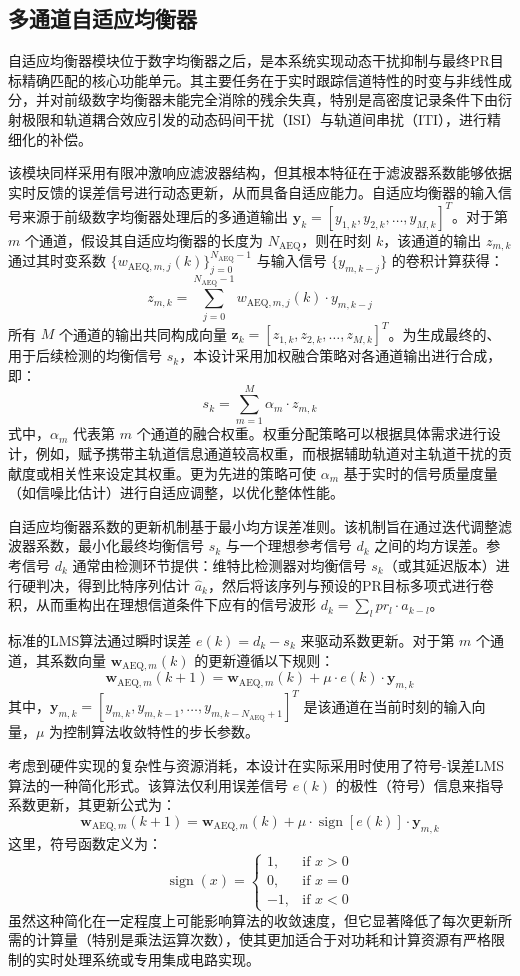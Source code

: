 \subsection{多通道自适应均衡器}

自适应均衡器模块位于数字均衡器之后，是本系统实现动态干扰抑制与最终PR目标精确匹配的核心功能单元。其主要任务在于实时跟踪信道特性的时变与非线性成分，并对前级数字均衡器未能完全消除的残余失真，特别是高密度记录条件下由衍射极限和轨道耦合效应引发的动态码间干扰（ISI）与轨道间串扰（ITI），进行精细化的补偿。

该模块同样采用有限冲激响应滤波器结构，但其根本特征在于滤波器系数能够依据实时反馈的误差信号进行动态更新，从而具备自适应能力。自适应均衡器的输入信号来源于前级数字均衡器处理后的多通道输出 $\mathbf{y}_k = [y_{1,k}, y_{2,k}, \ldots, y_{M,k}]^T$。对于第 $m$ 个通道，假设其自适应均衡器的长度为 $N_{\text{AEQ}}$，则在时刻 $k$，该通道的输出 $z_{m,k}$ 通过其时变系数 $\{w_{\text{AEQ}, m, j}(k)\}_{j=0}^{N_{\text{AEQ}}-1}$ 与输入信号 $\{y_{m, k-j}\}$ 的卷积计算获得：
\[
z_{m,k} = \sum_{j=0}^{N_{\text{AEQ}}-1} w_{\text{AEQ}, m, j}(k) \cdot y_{m, k-j}
\]
所有 $M$ 个通道的输出共同构成向量 $\mathbf{z}_k = [z_{1,k}, z_{2,k}, \ldots, z_{M,k}]^T$。为生成最终的、用于后续检测的均衡信号 $s_k$，本设计采用加权融合策略对各通道输出进行合成，即：
\[
s_k = \sum_{m=1}^{M} \alpha_m \cdot z_{m,k}
\]
式中，$\alpha_m$ 代表第 $m$ 个通道的融合权重。权重分配策略可以根据具体需求进行设计，例如，赋予携带主轨道信息通道较高权重，而根据辅助轨道对主轨道干扰的贡献度或相关性来设定其权重。更为先进的策略可使 $\alpha_m$ 基于实时的信号质量度量（如信噪比估计）进行自适应调整，以优化整体性能。

自适应均衡器系数的更新机制基于最小均方误差准则。该机制旨在通过迭代调整滤波器系数，最小化最终均衡信号 $s_k$ 与一个理想参考信号 $d_k$ 之间的均方误差。参考信号 $d_k$ 通常由检测环节提供：维特比检测器对均衡信号 $s_k$（或其延迟版本）进行硬判决，得到比特序列估计 $\hat{a}_k$，然后将该序列与预设的PR目标多项式进行卷积，从而重构出在理想信道条件下应有的信号波形 $d_k = \sum_{l} pr_l \cdot \hat{a}_{k-l}$。

标准的LMS算法通过瞬时误差 $e(k) = d_k - s_k$ 来驱动系数更新。对于第 $m$ 个通道，其系数向量 $\mathbf{w}_{\text{AEQ}, m}(k)$ 的更新遵循以下规则：
\[
\mathbf{w}_{\text{AEQ}, m}(k+1) = \mathbf{w}_{\text{AEQ}, m}(k) + \mu \cdot e(k) \cdot \mathbf{y}_{m, k}
\]
其中，$\mathbf{y}_{m, k} = [y_{m,k}, y_{m,k-1}, \ldots, y_{m,k-N_{\text{AEQ}}+1}]^T$ 是该通道在当前时刻的输入向量，$\mu$ 为控制算法收敛特性的步长参数。

考虑到硬件实现的复杂性与资源消耗，本设计在实际采用时使用了符号-误差LMS算法的一种简化形式。该算法仅利用误差信号 $e(k)$ 的极性（符号）信息来指导系数更新，其更新公式为：
\[
\mathbf{w}_{\text{AEQ}, m}(k+1) = \mathbf{w}_{\text{AEQ}, m}(k) + \mu \cdot \operatorname{sign}[e(k)] \cdot \mathbf{y}_{m, k}
\]
这里，符号函数定义为： 
\[
\operatorname{sign}(x) = 
\begin{cases} 
	1, & \text{if } x > 0 \\
	0, & \text{if } x = 0 \\
	-1, & \text{if } x < 0 
\end{cases}
\]
虽然这种简化在一定程度上可能影响算法的收敛速度，但它显著降低了每次更新所需的计算量（特别是乘法运算次数），使其更加适合于对功耗和计算资源有严格限制的实时处理系统或专用集成电路实现。

